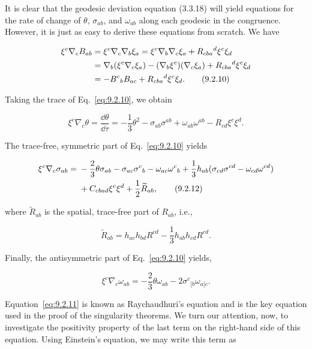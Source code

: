 It is clear that the geodesic deviation equation (3.3.18) will yield equations for the
rate of change of \(\theta\), \(\sigma_{ab}\), and \(\omega_{ab}\) along each geodesic in the
congruence. However, it is just as easy to derive these equations from scratch. We
have

\begin{align}
  \xi^c\nabla_cB_{ab}
    &=\xi^c\nabla_c\nabla_b\xi_a
      =\xi^c\nabla_b\nabla_c\xi_a+R_{cba}{}^d\xi^c\xi_d \notag\\
    &=\nabla_b(\xi^c\nabla_c\xi_a)
      -(\nabla_b\xi^c)(\nabla_c\xi_a)
      +R_{cba}{}^d\xi^c\xi_d \notag\\
    &=-B^c{}_bB_{ac}+R_{cba}{}^d\xi^c\xi_d .
  \tag{9.2.10}\label{eq:9.2.10}
\end{align}

Taking the trace of Eq.~\eqref{eq:9.2.10}, we obtain

\begin{equation}
  \xi^c\nabla_c\theta
  =\frac{\dd\theta}{\dd\tau}
  =-\frac13\theta^2-\sigma_{ab}\sigma^{ab}
   +\omega_{ab}\omega^{ab}-R_{cd}\xi^c\xi^d .
  \tag{9.2.11}\label{eq:9.2.11}
\end{equation}

The trace-free, symmetric part of Eq.~\eqref{eq:9.2.10} yields

\begin{align}
  \xi^c\nabla_c\sigma_{ab}
    ={}&-\frac23\theta\sigma_{ab}-\sigma_{ac}\sigma^c{}_b
        -\omega_{ac}\omega^c{}_b
        +\frac13h_{ab}(\sigma_{cd}\sigma^{cd}-\omega_{cd}\omega^{cd})\notag\\
      &+C_{cbad}\xi^c\xi^d+\frac12\widetilde R_{ab} ,
  \tag{9.2.12}\label{eq:9.2.12}
\end{align}

where \(\widetilde R_{ab}\) is the spatial, trace-free part of \(R_{ab}\), i.e.,

\begin{equation}
  \widetilde R_{ab}
  =h_{ac}h_{bd}R^{cd}-\frac13h_{ab}h_{cd}R^{cd} .
  \tag{9.2.13}\label{eq:9.2.13}
\end{equation}

Finally, the antisymmetric part of Eq.~\eqref{eq:9.2.10} yields,

\begin{equation}
  \xi^c\nabla_c\omega_{ab}
  =-\frac23\theta\omega_{ab}-2\sigma^c{}_{[b}\omega_{a]c} .
  \tag{9.2.14}\label{eq:9.2.14}
\end{equation}

Equation~\eqref{eq:9.2.11} is known as Raychaudhuri's equation and is the key equation
used in the proof of the singularity theorems. We turn our attention, now, to
investigate the positivity property of the last term on the right-hand side of this
equation. Using Einstein's equation, we may write this term as

